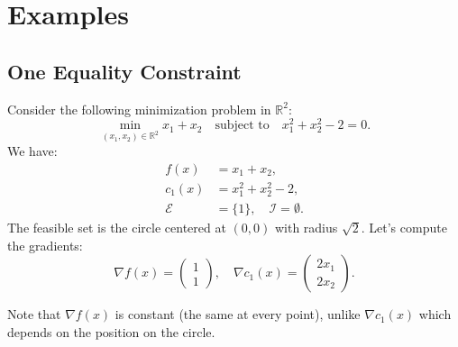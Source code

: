 \section{Examples}

\subsection{One Equality Constraint}

Consider the following minimization problem in $\mathbb{R}^2$:
\begin{equation}
    \min_{(x_1, x_2) \in \mathbb{R}^2} x_1 + x_2 \quad \text{subject to} \quad x_1^2 + x_2^2 - 2 = 0.
\end{equation}
We have:
\begin{align*}
    f(x) &= x_1 + x_2, \\
    c_1(x) &= x_1^2 + x_2^2 - 2, \\
    \mathcal{E} &= \{1\}, \quad \mathcal{I} = \emptyset.
\end{align*}
The feasible set is the circle centered at $(0,0)$ with radius $\sqrt{2}$.
Let's compute the gradients:
\begin{equation}
    \nabla f(x) = \begin{pmatrix} 1 \\ 1 \end{pmatrix}, \quad \nabla c_1(x) = \begin{pmatrix} 2x_1 \\ 2x_2 \end{pmatrix}.
\end{equation}

Note that $\nabla f(x)$ is constant (the same at every point), unlike $\nabla c_1(x)$ which depends on the position on the circle.


